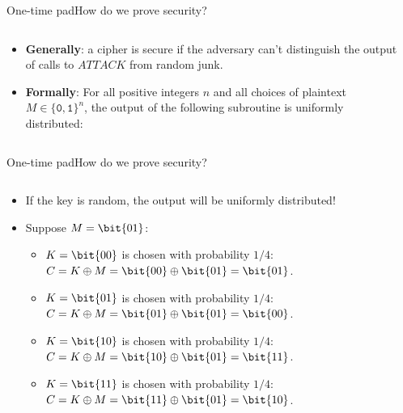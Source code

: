 \documentclass[aspectratio=169, lualatex, handout]{beamer}
\begin{document}
\begin{frame}{One-time pad}{How do we prove security?}
	\begin{columns}[c]
		\begin{column}{0.5\textwidth}
			\begin{itemize}[<+->]
				\item \textbf{Generally}: a cipher is secure if the adversary can't distinguish the output of calls to $ATTACK$ from random junk.
				\item \textbf{Formally}: For all positive integers $n$ and all choices of plaintext $M \in \{\texttt{0}, \texttt{1}\}^n$, the output of the following subroutine is uniformly distributed:
			\end{itemize}
		\end{column}
		\begin{column}{0.5\textwidth}
		\end{column}
	\end{columns}
\end{frame}

\begin{frame}{One-time pad}{How do we prove security?}
	\begin{columns}[c]
		\begin{column}{0.7\textwidth}
			\begin{itemize}[<+->]
				\item If the key is random, the output will be uniformly distributed!
				\item Suppose $M = \bit{01}$:
				      \begin{itemize}[<+->]
					      \item $K = \bit{00}$ is chosen with probability $1/4$:\\$C = K \oplus M = \bit{00} \oplus \bit{01} = \bit{01}$.
					      \item $K = \bit{01}$ is chosen with probability $1/4$:\\$C = K \oplus M = \bit{01} \oplus \bit{01} = \bit{00}$.
					      \item $K = \bit{10}$ is chosen with probability $1/4$:\\$C = K \oplus M = \bit{10} \oplus \bit{01} = \bit{11}$.
					      \item $K = \bit{11}$ is chosen with probability $1/4$:\\$C = K \oplus M = \bit{11} \oplus \bit{01} = \bit{10}$.
				      \end{itemize}
			\end{itemize}
		\end{column}
		\begin{column}{0.3\textwidth}
		\end{column}
	\end{columns}
\end{frame}
\end{document}
